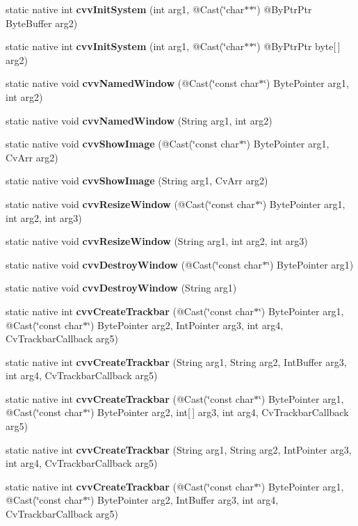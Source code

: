 \begin{DoxyCompactItemize}
\item 
static native int {\bfseries cvv\+Init\+System} (int arg1, @Cast(\char`\"{}char$\ast$$\ast$\char`\"{}) @By\+Ptr\+Ptr Byte\+Buffer arg2)
\item 
static native int {\bfseries cvv\+Init\+System} (int arg1, @Cast(\char`\"{}char$\ast$$\ast$\char`\"{}) @By\+Ptr\+Ptr byte\mbox{[}$\,$\mbox{]} arg2)
\item 
static native void {\bfseries cvv\+Named\+Window} (@Cast(\char`\"{}const char$\ast$\char`\"{}) Byte\+Pointer arg1, int arg2)
\item 
static native void {\bfseries cvv\+Named\+Window} (String arg1, int arg2)
\item 
static native void {\bfseries cvv\+Show\+Image} (@Cast(\char`\"{}const char$\ast$\char`\"{}) Byte\+Pointer arg1, Cv\+Arr arg2)
\item 
static native void {\bfseries cvv\+Show\+Image} (String arg1, Cv\+Arr arg2)
\item 
static native void {\bfseries cvv\+Resize\+Window} (@Cast(\char`\"{}const char$\ast$\char`\"{}) Byte\+Pointer arg1, int arg2, int arg3)
\item 
static native void {\bfseries cvv\+Resize\+Window} (String arg1, int arg2, int arg3)
\item 
static native void {\bfseries cvv\+Destroy\+Window} (@Cast(\char`\"{}const char$\ast$\char`\"{}) Byte\+Pointer arg1)
\item 
static native void {\bfseries cvv\+Destroy\+Window} (String arg1)
\item 
static native int {\bfseries cvv\+Create\+Trackbar} (@Cast(\char`\"{}const char$\ast$\char`\"{}) Byte\+Pointer arg1, @Cast(\char`\"{}const char$\ast$\char`\"{}) Byte\+Pointer arg2, Int\+Pointer arg3, int arg4, Cv\+Trackbar\+Callback arg5)
\item 
static native int {\bfseries cvv\+Create\+Trackbar} (String arg1, String arg2, Int\+Buffer arg3, int arg4, Cv\+Trackbar\+Callback arg5)
\item 
static native int {\bfseries cvv\+Create\+Trackbar} (@Cast(\char`\"{}const char$\ast$\char`\"{}) Byte\+Pointer arg1, @Cast(\char`\"{}const char$\ast$\char`\"{}) Byte\+Pointer arg2, int\mbox{[}$\,$\mbox{]} arg3, int arg4, Cv\+Trackbar\+Callback arg5)
\item 
static native int {\bfseries cvv\+Create\+Trackbar} (String arg1, String arg2, Int\+Pointer arg3, int arg4, Cv\+Trackbar\+Callback arg5)
\item 
static native int {\bfseries cvv\+Create\+Trackbar} (@Cast(\char`\"{}const char$\ast$\char`\"{}) Byte\+Pointer arg1, @Cast(\char`\"{}const char$\ast$\char`\"{}) Byte\+Pointer arg2, Int\+Buffer arg3, int arg4, Cv\+Trackbar\+Callback arg5)

\end{DoxyCompactItemize}
